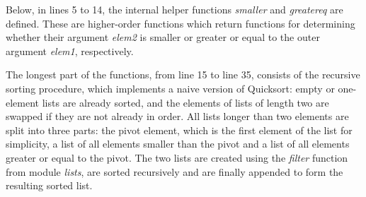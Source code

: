 \begin{appendix}
Below, in lines 5 to 14, the internal helper functions {\em smaller}
and {\em greatereq} are defined.  These are higher-order functions
which return functions for determining whether their argument {\em
  elem2} is smaller or greater or equal to the outer argument {\em
  elem1}, respectively.

The longest part of the functions, from line 15 to line 35, consists
of the recursive sorting procedure, which implements a naive version
of Quicksort: empty or one-element lists are already sorted, and the
elements of lists of length two are swapped if they are not already in
order.  All lists longer than two elements are split into three parts:
the pivot element, which is the first element of the list for
simplicity, a list of all elements smaller than the pivot and a list
of all elements greater or equal to the pivot.  The two lists are
created using the {\em filter} function from module {\em lists}, are
sorted recursively and are finally appended to form the resulting
sorted list.


\end{appendix}
